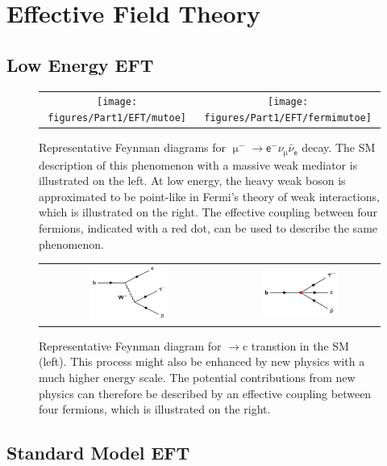 \chapter{Effective Field Theory}
\label{chap:EFT}

\section{Low Energy EFT}
\label{sec:LEFT}

\begin{figure}[tbh!]
 \begin{center}
 \begin{tabular}{cc}
 \texttt{[image: figures/Part1/EFT/mutoe]}&
 \texttt{[image: figures/Part1/EFT/fermimutoe]}\\
 \end{tabular}
 \caption{Representative Feynman diagrams for $\upmu^{-}\rightarrow\textsf{e}^{-}\nu_{\upmu}\bar{\nu}_{\textsf{e}}$ decay. The \ac{SM} description of this phenomenon with a massive weak mediator is illustrated on the left. At low energy, the heavy weak boson is approximated to be point-like in Fermi's theory of weak interactions, which is illustrated on the right. The effective coupling between four fermions, indicated with a red dot, can be used to describe the same phenomenon.}
 \label{fig:FermiEFT}
 \end{center}
\end{figure}

\begin{figure}[tbh!]
 \begin{center}
 \begin{tabular}{cc}
 \includegraphics[width=0.45\textwidth]{figures/Part1/BSM/SMbtoc}&
 \includegraphics[width=0.5\textwidth]{figures/Part1/EFT/LEFT}
 \end{tabular}
 \caption{Representative Feynman diagram for $\rightarrow$c transtion in the \ac{SM} (left). This process might also be enhanced by new physics with a much higher energy scale. The potential contributions from new physics can therefore be described by an effective coupling between four fermions, which is illustrated on the right.}
 \label{fig:LEFT}
 \end{center}
\end{figure}

\section{Standard Model EFT}
\label{sec:SMEFT}